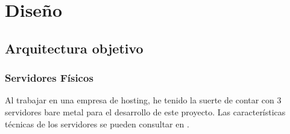 \chapter {Diseño}
\section{Arquitectura objetivo}
\subsection{Servidores Físicos}
\begin{text}
	Al trabajar en una empresa de hosting, he tenido la suerte de contar con 3 servidores bare metal para el desarrollo de este proyecto. Las características técnicas de los servidores se pueden consultar en .
\end{text}
